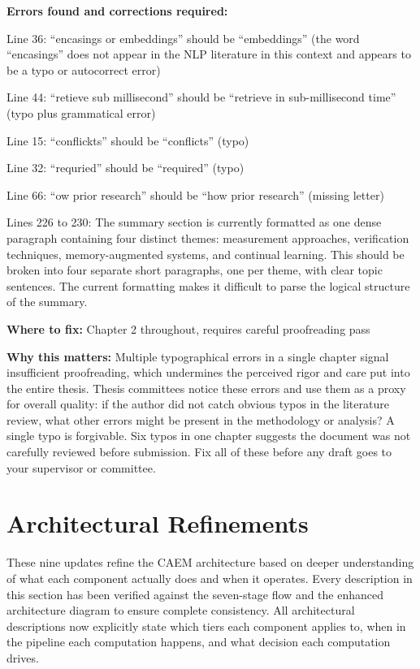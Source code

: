 \documentclass[11pt,a4paper]{article}
\newcommand{\criticalbox}[2]{%
\begin{tcolorbox}[enhanced,breakable,
  colback=LightCrimson,colframe=Crimson,boxrule=1.5pt,arc=4pt,
  left=8pt,right=8pt,top=6pt,bottom=6pt,
  title={\bfseries\small\color{white}#1},
  attach boxed title to top left={yshift=-2mm,xshift=6mm},
  boxed title style={colback=Crimson,arc=3pt,boxrule=0pt,
    left=4pt,right=4pt,top=2pt,bottom=2pt}]
#2
\end{tcolorbox}}
\begin{document}
\criticalbox{CORRECTION 6: Chapter 2 Typographical Errors and Prose Issues}{
\textbf{Errors found and corrections required:}

Line 36: ``encasings or embeddings'' should be ``embeddings'' (the word ``encasings'' does not appear in the NLP literature in this context and appears to be a typo or autocorrect error)

Line 44: ``retieve sub millisecond'' should be ``retrieve in sub-millisecond time'' (typo plus grammatical error)

Line 15: ``conflickts'' should be ``conflicts'' (typo)

Line 32: ``requried'' should be ``required'' (typo)

Line 66: ``ow prior research'' should be ``how prior research'' (missing letter)

Lines 226 to 230: The summary section is currently formatted as one dense paragraph containing four distinct themes: measurement approaches, verification techniques, memory-augmented systems, and continual learning. This should be broken into four separate short paragraphs, one per theme, with clear topic sentences. The current formatting makes it difficult to parse the logical structure of the summary.

\textbf{Where to fix:} Chapter 2 throughout, requires careful proofreading pass

\textbf{Why this matters:} Multiple typographical errors in a single chapter signal insufficient proofreading, which undermines the perceived rigor and care put into the entire thesis. Thesis committees notice these errors and use them as a proxy for overall quality: if the author did not catch obvious typos in the literature review, what other errors might be present in the methodology or analysis? A single typo is forgivable. Six typos in one chapter suggests the document was not carefully reviewed before submission. Fix all of these before any draft goes to your supervisor or committee.
}

\newpage

\section{Architectural Refinements}
\label{sec:architecture}

These nine updates refine the CAEM architecture based on deeper understanding of what each component actually does and when it operates. Every description in this section has been verified against the seven-stage flow and the enhanced architecture diagram to ensure complete consistency. All architectural descriptions now explicitly state which tiers each component applies to, when in the pipeline each computation happens, and what decision each computation drives.
\end{document}
